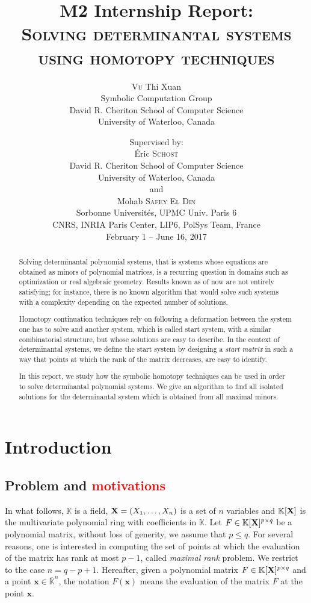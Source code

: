 \documentclass[11pt]{article}
\title{M2 Internship Report: \\
\textsc{Solving determinantal systems using homotopy techniques}}
\author{\textsc{Vu} Thi Xuan\\
Symbolic Computation Group \\
David R. Cheriton School of Computer Science\\ University of Waterloo, Canada}
\date{
Supervised by:\\
\vspace*{0.3cm}
Éric \textsc{Schost}\\
David R. Cheriton School of Computer Science\\ University of Waterloo, Canada\\
\vspace*{0.3cm}
and \\
\vspace*{0.3cm}
Mohab \textsc{Safey El Din}\\ 
Sorbonne Universités, UPMC Univ. Paris 6\\
CNRS, INRIA Paris Center, LIP6, PolSys Team, France\\
\vspace*{1cm}
February 1 -- June 16, 2017
}
\numberwithin{Property}{section}
\numberwithin{Theorem}{section}
\numberwithin{Proposition}{section}
\numberwithin{Lemma}{section}
\numberwithin{Corollary}{section}
\numberwithin{Definition}{section}
\numberwithin{Remark}{section}
\numberwithin{Conjecture}{section}
\numberwithin{Problem}{section}
\numberwithin{Claim}{section}
\theoremstyle{definition}
\numberwithin{Example}{section}
\renewcommand{\leq}{\leqslant}
\def\bar{\overline}
\newcommand{\field}{\mathbb{K}} %
\newcommand{\mat}[1]{\mathbf{\MakeUppercase{#1}}} %
\newcommand{\todo}[1]{\textcolor{red}{#1}} %
\begin{document}
\maketitle
\begin{abstract}
Solving determinantal polynomial systems, that is systems whose equations are obtained as minors of polynomial matrices, is a recurring question in domains such as optimization or real algebraic geometry. Results known as of now are not entirely satisfying; for instance, there is no known algorithm that would solve such systems with a complexity depending on the expected number of solutions. 

Homotopy continuation techniques rely on following a deformation between the system one has to solve and another system, which is called start system, with a similar combinatorial structure, but whose solutions are easy to describe. In the context of determinantal systems, we define the start system by designing a \emph{start matrix} in such a way that points at which the rank of the matrix decreases, are easy to identify. 

In this report, we study how the symbolic homotopy techniques can be used in order to solve determinantal polynomial systems. We give an algorithm to find all isolated solutions for the determinantal system which is obtained from all maximal minors. 
\end{abstract}
\newpage

\section{Introduction}
\label{sec:intro}
\subsection{Problem and \todo{motivations}} In what follows, $\field$ is a field, $\mat{X} = (X_1, \ldots, X_n)$ is a set of $n$ variables and $\field[\mat{X}]$ is the multivariate polynomial ring with coefficients in $\field$. Let $F \in \field[\mat{X}]^{p \times q}$ be a polynomial matrix, without loss of generity, we assume that $p \leq q$. For several reasons, one is interested in computing the set of points at which the evaluation of the matrix has rank at most $p-1$, called \emph{maximal rank} problem. We restrict to the case $n = q-p+1$. Hereafter, given a polynomial matrix $F \in \field[\mat{X}]^{p \times q}$ and a point $\mathbf{x} \in \bar{\field}^n$, the notation $F({\mathbf{x}})$ means the evaluation of the matrix $F$ at the point $\mathbf{x}$. 
\end{document}
